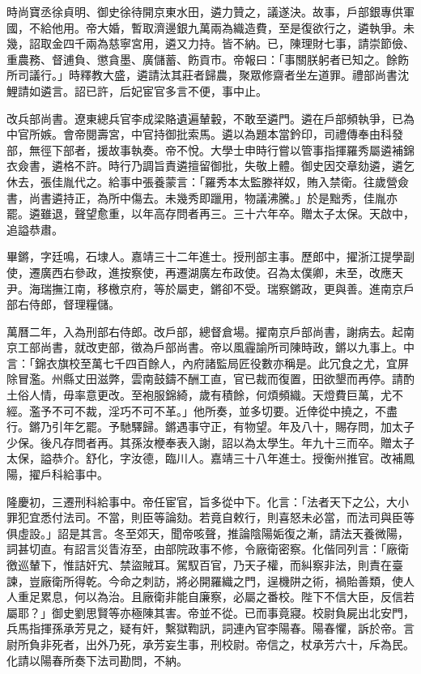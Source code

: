 \begin{pinyinscope}
時尚寶丞徐貞明、御史徐待開京東水田，遴力贊之，議遂決。故事，戶部銀專供軍國，不給他用。帝大婚，暫取濟邊銀九萬兩為織造費，至是復欲行之，遴執爭。未幾，詔取金四千兩為慈寧宮用，遴又力持。皆不納。已，陳理財七事，請崇節儉、重農務、督逋負、懲貪墨、廣儲蓄、飭貢市。帝報曰：「事關朕躬者已知之。餘飭所司議行。」時釋教大盛，遴請汰其莊者歸農，聚眾修齋者坐左道罪。禮部尚書沈鯉請如遴言。詔已許，后妃宦官多言不便，事中止。

改兵部尚書。遼東總兵官李成梁賂遺遍輦轂，不敢至遴門。遴在戶部頻執爭，已為中官所嫉。會帝閱壽宮，中官持御批索馬。遴以為題本當鈐印，司禮傳奉由科發部，無徑下部者，援故事執奏。帝不悅。大學士申時行嘗以管事指揮羅秀屬遴補錦衣僉書，遴格不許。時行乃調旨責遴擅留御批，失敬上體。御史因交章劾遴，遴乞休去，張佳胤代之。給事中張養蒙言：「羅秀本太監滕祥奴，賄入禁衛。往歲營僉書，尚書遴持正，為所中傷去。未幾秀即躐用，物議沸騰。」於是黜秀，佳胤亦罷。遴雖退，聲望愈重，以年高存問者再三。三十六年卒。贈太子太保。天啟中，追謚恭肅。

畢鏘，字廷鳴，石埭人。嘉靖三十二年進士。授刑部主事。歷郎中，擢浙江提學副使，遷廣西右參政，進按察使，再遷湖廣左布政使。召為太僕卿，未至，改應天尹。海瑞撫江南，移檄京府，等於屬吏，鏘卻不受。瑞察鏘政，更與善。進南京戶部右侍郎，督理糧儲。

萬曆二年，入為刑部右侍郎。改戶部，總督倉場。擢南京戶部尚書，謝病去。起南京工部尚書，就改吏部，徵為戶部尚書。帝以風霾諭所司陳時政，鏘以九事上。中言：「錦衣旗校至萬七千四百餘人，內府諸監局匠役數亦稱是。此冗食之尤，宜屏除冒濫。州縣丈田滋弊，雲南鼓鑄不酬工直，官已裁而復置，田欲墾而再停。請酌土俗人情，毋率意更改。至袍服錦綺，歲有積餘，何煩頻織。天燈費巨萬，尤不經。濫予不可不裁，淫巧不可不革。」他所奏，並多切要。近倖從中撓之，不盡行。鏘乃引年乞罷。予馳驛歸。鏘遇事守正，有物望。年及八十，賜存問，加太子少保。後凡存問者再。其孫汝楩奉表入謝，詔以為太學生。年九十三而卒。贈太子太保，謚恭介。舒化，字汝德，臨川人。嘉靖三十八年進士。授衡州推官。改補鳳陽，擢戶科給事中。

隆慶初，三遷刑科給事中。帝任宦官，旨多從中下。化言：「法者天下之公，大小罪犯宜悉付法司。不當，則臣等論劾。若竟自敕行，則喜怒未必當，而法司與臣等俱虛設。」詔是其言。冬至郊天，聞帝咳聲，推論陰陽姤復之漸，請法天養微陽，詞甚切直。有詔言災眚洊至，由部院政事不修，令廠衛密察。化偕同列言：「廠衛徼巡輦下，惟詰奸宄、禁盜賊耳。駕馭百官，乃天子權，而糾察非法，則責在臺諫，豈廠衛所得乾。今命之刺訪，將必開羅織之門，逞機阱之術，禍貽善類，使人人重足累息，何以為治。且廠衛非能自廉察，必屬之番校。陛下不信大臣，反信若屬耶？」御史劉思賢等亦極陳其害。帝並不從。已而事竟寢。校尉負屍出北安門，兵馬指揮孫承芳見之，疑有奸，繫獄鞫訊，詞連內官李陽春。陽春懼，訴於帝。言尉所負非死者，出外乃死，承芳妄生事，刑校尉。帝信之，杖承芳六十，斥為民。化請以陽春所奏下法司勘問，不納。


\end{pinyinscope}
